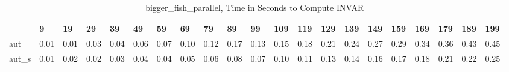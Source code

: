 \begin{table}
\caption{bigger_fish_parallel, Time in Seconds to Compute INVAR}
\label{bigger_fish_parallel_INVAR_time}
\begin{tabular}{lllllllllllllllllllll}
\toprule
 & 9 & 19 & 29 & 39 & 49 & 59 & 69 & 79 & 89 & 99 & 109 & 119 & 129 & 139 & 149 & 159 & 169 & 179 & 189 & 199 \\
\midrule
aut & 0.01 & 0.01 & 0.03 & 0.04 & 0.06 & 0.07 & 0.10 & 0.12 & 0.17 & 0.13 & 0.15 & 0.18 & 0.21 & 0.24 & 0.27 & 0.29 & 0.34 & 0.36 & 0.43 & 0.45 \\
aut_s & 0.01 & 0.02 & 0.02 & 0.03 & 0.04 & 0.04 & 0.05 & 0.06 & 0.08 & 0.07 & 0.10 & 0.11 & 0.13 & 0.14 & 0.16 & 0.17 & 0.18 & 0.21 & 0.22 & 0.25 \\
\bottomrule
\end{tabular}
\end{table}
